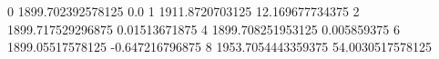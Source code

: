 0 1899.702392578125 0.0
1 1911.8720703125 12.169677734375
2 1899.717529296875 0.01513671875
4 1899.708251953125 0.005859375
6 1899.05517578125 -0.647216796875
8 1953.7054443359375 54.0030517578125
